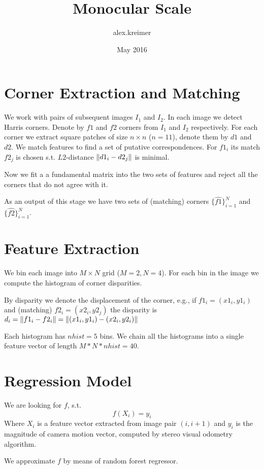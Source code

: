 \documentclass{article}
\title{Monocular Scale}
\author{alex.kreimer}
\date{May 2016}
\DeclarePairedDelimiter{\norm}{\lVert}{\rVert}
\begin{document}
\maketitle

\section{Corner Extraction and Matching}

We work with pairs of subsequent images $I_1$ and $I_2$.  In each
image we detect Harris corners. Denote by ${f1}$ and $f2$ corners from
$I_1$ and $I_2$ respectively.  For each corner we extract square
patches of size $n\times n$ ($n=11$), denote them by $d1$ and $d2$.
We match features to find a set of putative correspondences.  For
$f1_i$ its match $f2_j$ is chosen s.t. $L2$-distance
$\norm{d1_i-d2_j}$ is minimal.

Now we fit a a fundamental matrix into the two sets of features and
reject all the corners that do not agree with it.

As an output of this stage we have two sets of (matching) corners
$\{\hat{f1}\}_{i=1}^{N}$ and $\{\hat{f2}\}_{i=1}^{N}$.

\section{Feature Extraction}\label{sec:features}

We bin each image into $M\times N$ grid ($M=2, N=4$).  For each bin in
the image we compute the histogram of corner disparities.

By disparity we denote the displacement of the corner, e.g., if
$f1_i=(x1_i,y1_i)$ and (matching) $f2_i=(x2_i,y2_j)$ the disparity is
$d_i = \norm{f1_i-f2_i} = \norm{(x1_i,y1_i)-(x2_i,y2_i)}$

Each histogram has $nhist=5$ bins.  We chain all the histograms into a single feature vector of length $M*N*nhist=40$.

\section{Regression Model}

We are looking for $f$, s.t.
\[
  f(X_i) = y_i
\]
Where $X_i$ is a feature vector extracted from image pair $(i,i+1)$
and $y_i$ is the magnitude of camera motion vector, computed by stereo
visual odometry algorithm.

We approximate $f$ by means of random forest regressor.
\end{document}
